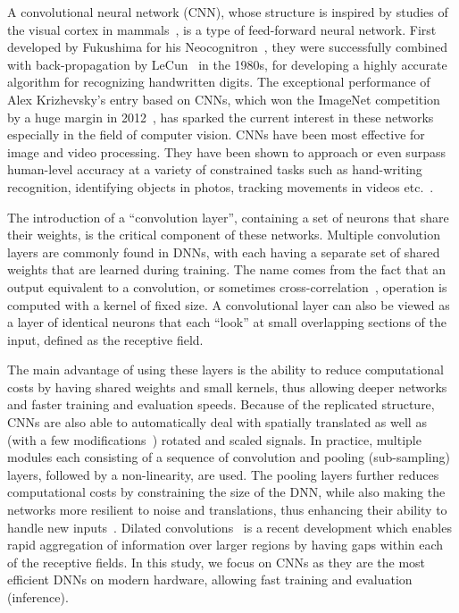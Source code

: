 \documentclass[aps,prd,%
amsmath,floats,floatfix, twocolumn, superscriptaddress,nofootinbib,showpacs]{revtex4-1}
\begin{document}
A convolutional neural network (CNN), whose structure is inspired by studies of the visual cortex in mammals~\cite{DL-Book}, is a type of feed-forward neural network. First developed by Fukushima for his Neocognitron~\cite{Neocognitron}, they were successfully combined with back-propagation by LeCun~\cite{ConvNet} in the 1980s, for developing a highly accurate algorithm for recognizing handwritten digits.  The exceptional performance of Alex Krizhevsky's entry based on CNNs, which won the ImageNet competition by a huge margin in 2012~\cite{AlexNet}, has sparked the current interest in these networks especially in the field of computer vision. CNNs have been most effective for image and video processing. They have been shown to approach or even surpass human-level accuracy at a variety of constrained tasks such as hand-writing recognition, identifying objects in photos, tracking movements in videos etc.~\cite{DL-Nature}.

The introduction of a ``convolution layer'', containing a set of neurons that share their weights, is the critical component of these networks. Multiple convolution layers are commonly found in DNNs, with each having a separate set of shared weights that are learned during training. The name comes from the fact that an output equivalent to a convolution, or sometimes cross-correlation~\cite{DL-Book}, operation is computed with a kernel of fixed size. A convolutional layer can also be viewed as a layer of identical neurons that each ``look'' at small overlapping sections of the input, defined as the receptive field. 

The main advantage of using these layers is the ability to reduce computational costs by having shared weights and small kernels, thus allowing deeper networks and faster training and evaluation speeds. Because of the replicated structure, CNNs are also able to automatically deal with spatially translated as well as (with a few modifications~\cite{DL-Nature}) rotated and scaled signals. In practice, multiple modules each consisting of a sequence of convolution and pooling (sub-sampling) layers, followed by a non-linearity, are used. The pooling layers further reduces computational costs by constraining the size of the DNN, while also making the networks more resilient to noise and translations, thus enhancing their ability to handle new inputs~\cite{DL-Nature}. Dilated convolutions~\cite{dilatedCNN} is a recent development which enables rapid aggregation of information over larger regions by having gaps within each of the receptive fields. In this study, we focus on CNNs as they are the most efficient DNNs on modern hardware, allowing fast training and evaluation (inference).
\end{document}
